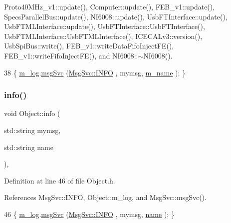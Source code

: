 Proto40\+M\+Hz\+\_\+v1\+::update(), Computer\+::update(), F\+E\+B\+\_\+v1\+::update(), Specs\+Parallel\+Bus\+::update(), N\+I6008\+::update(), Usb\+F\+T\+Interface\+::update(), Usb\+F\+T\+M\+L\+Interface\+::update(), Usb\+F\+T\+Interface\+::\+Usb\+F\+T\+Interface(), Usb\+F\+T\+M\+L\+Interface\+::\+Usb\+F\+T\+M\+L\+Interface(), I\+C\+E\+C\+A\+Lv3\+::version(), Usb\+Spi\+Bus\+::write(), F\+E\+B\+\_\+v1\+::write\+Data\+Fifo\+Inject\+F\+E(), F\+E\+B\+\_\+v1\+::write\+Fifo\+Inject\+F\+E(), and N\+I6008\+::$\sim$\+N\+I6008().


\begin{DoxyCode}
38 \{ \hyperlink{classObject_a0d269813dd7ac1f24bc143031e2963f2}{m\_log}.\hyperlink{classMsgSvc_ad25f18047920cc59a314e5098259711c}{msgSvc} (\hyperlink{classMsgSvc_ae671eb7301996cd049d2da8a65925926ad2fcf3f3e734fc41ee097cc23670ce51}{MsgSvc::INFO}    , mymsg, \hyperlink{classObject_a8b83c95c705d2c3ba0d081fe1710f48d}{m\_name} ); \}
\end{DoxyCode}
\mbox{\label{classObject_a1ca123253dfd30fc28b156f521dcbdae}} 
\subsubsection{\texorpdfstring{info()}{info()}\hspace{0.1cm}{\footnotesize\ttfamily [2/2]}}
{\footnotesize\ttfamily void Object\+::info (\begin{DoxyParamCaption}\item[{std\+::string}]{mymsg,  }\item[{std\+::string}]{name }\end{DoxyParamCaption})\hspace{0.3cm}{\ttfamily [inline]}, {\ttfamily [inherited]}}



Definition at line 46 of file Object.\+h.



References Msg\+Svc\+::\+I\+N\+FO, Object\+::m\+\_\+log, and Msg\+Svc\+::msg\+Svc().


\begin{DoxyCode}
46 \{ \hyperlink{classObject_a0d269813dd7ac1f24bc143031e2963f2}{m\_log}.\hyperlink{classMsgSvc_ad25f18047920cc59a314e5098259711c}{msgSvc} (\hyperlink{classMsgSvc_ae671eb7301996cd049d2da8a65925926ad2fcf3f3e734fc41ee097cc23670ce51}{MsgSvc::INFO}    , mymsg, \hyperlink{classObject_a300f4c05dd468c7bb8b3c968868443c1}{name} ); \}
\end{DoxyCode}
\mbox{\label{classMSOxxxx_ac14ed16b221798423e7c3b5e285006b5}} 
